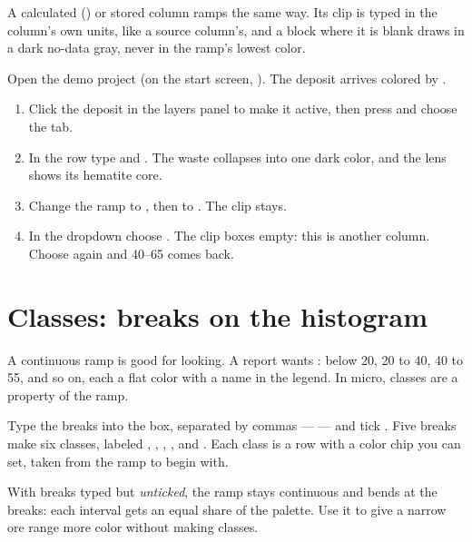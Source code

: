 A calculated () or stored column ramps the same way. Its clip is typed in the column's own units, like a source column's, and a block where it is blank draws in a dark no-data gray, never in the ramp's lowest color.

\begin{tryit}
Open the demo project (on the start screen, ). The deposit arrives colored by .
\begin{enumerate}
\item Click the deposit in the layers panel to make it active, then press  and choose the  tab.
\item In the  row type  and . The waste collapses into one dark color, and the lens shows its hematite core.
\item Change the ramp to , then to . The clip stays.
\item In the  dropdown choose . The clip boxes empty: this is another column. Choose  again and 40–65 comes back.
\end{enumerate}
\end{tryit}

\section{Classes: breaks on the histogram}\label{sec:color-classes}
A continuous ramp is good for looking. A report wants : below 20, 20 to 40, 40 to 55, and so on, each a flat color with a name in the legend. In micro, classes are a property of the ramp.

Type the breaks into the  box, separated by commas —  — and tick . Five breaks make six classes, labeled , , , ,  and . Each class is a row with a color chip you can set, taken from the ramp to begin with.

With breaks typed but  \emph{unticked}, the ramp stays continuous and bends at the breaks: each interval gets an equal share of the palette. Use it to give a narrow ore range more color without making classes.


